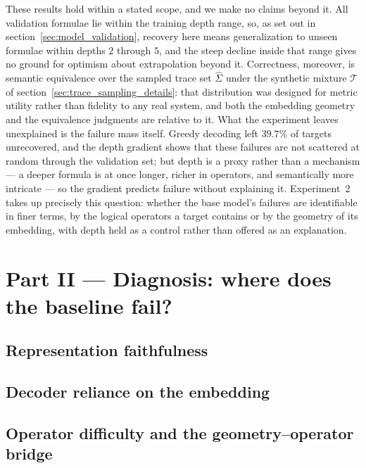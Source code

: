\documentclass[titlepage,a4paper,11pt]{report}
\begin{document}
    These results hold within a stated scope, and we make no claims beyond it. All validation formulae lie within the training depth range, so, as set out in section~\ref{sec:model_validation}, recovery here means generalization to unseen formulae within depths $2$ through $5$, and the steep decline inside that range gives no ground for optimism about extrapolation beyond it. Correctness, moreover, is semantic equivalence over the sampled trace set $\widehat\Sigma$ under the synthetic mixture $\mathcal{T}$ of section~\ref{sec:trace_sampling_details}: that distribution was designed for metric utility rather than fidelity to any real system, and both the embedding geometry and the equivalence judgments are relative to it. What the experiment leaves unexplained is the failure mass itself. Greedy decoding left $39.7\%$ of targets unrecovered, and the depth gradient shows that these failures are not scattered at random through the validation set; but depth is a proxy rather than a mechanism --- a deeper formula is at once longer, richer in operators, and semantically more intricate --- so the gradient predicts failure without explaining it. Experiment~2 takes up precisely this question: whether the base model's failures are identifiable in finer terms, by the logical operators a target contains or by the geometry of its embedding, with depth held as a control rather than offered as an explanation.

    
    \section{Part II --- Diagnosis: where does the baseline fail?}\label{sec:geometry_analysis}
    
    
    \subsection{Representation faithfulness}\label{sec:rep_faithfulness}
    
    
    \subsection{Decoder reliance on the embedding}\label{sec:decoder_reliance}
    
    
    \subsection{Operator difficulty and the geometry--operator bridge}\label{sec:operator_difficulty}
    
\end{document}
